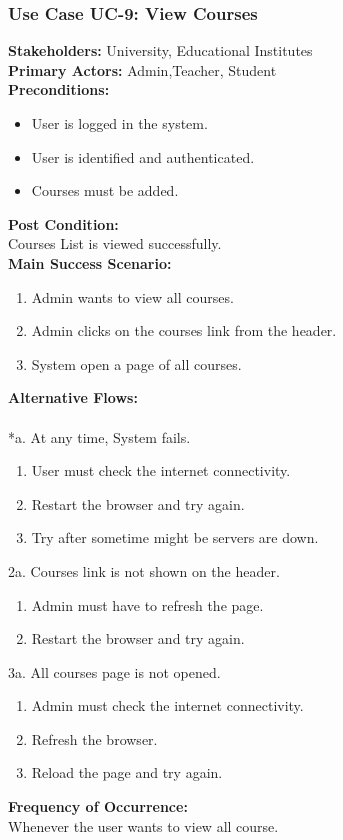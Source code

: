 \documentclass[12pt]{article}
\begin{document}
\subsubsection{Use Case UC-9: View Courses}
\textbf{Stakeholders: } University, Educational Institutes \\
\textbf{Primary Actors: }Admin,Teacher, Student \\
\textbf{Preconditions:}
\begin{itemize}
\item User is logged in the system.
\item User is identified and authenticated.
\item Courses must be added.
\end{itemize}
\textbf{Post Condition: }\\
Courses List is viewed successfully.\\
\textbf{Main Success Scenario:}
\begin{enumerate}
\item Admin wants to view all courses.
\item Admin clicks on the courses link from the header.
\item System open a page of all courses.
\end{enumerate}
\textbf{Alternative Flows:}\\
\\
*a. At any time, System fails.
\begin{enumerate}
\item User must check the internet connectivity.
\item Restart the browser and try again.
\item Try after sometime might be servers are down.
\end{enumerate}
2a. Courses link is not shown on the header.
\begin{enumerate}
\item Admin must have to refresh the page.
\item Restart the browser and try again.
\end{enumerate} 
3a. All courses page is not opened.
\begin{enumerate}
\item Admin must check the internet connectivity.
\item Refresh the browser.
\item Reload the page and try again.
\end{enumerate}
\textbf{Frequency of Occurrence:}\\
Whenever the user wants to view all course.
\end{document}
